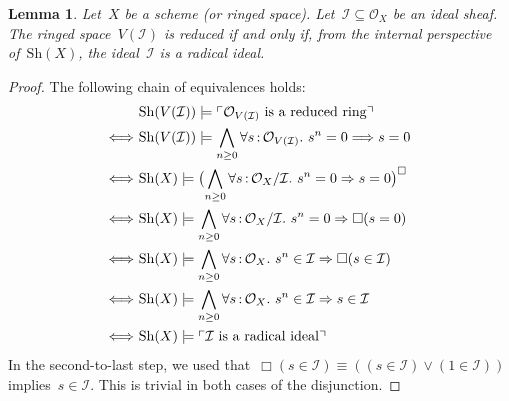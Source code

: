 \documentclass[10pt]{amsart}
\theoremstyle{definition}
\theoremstyle{plain}
\newtheorem{lemma}[defn]{Lemma}
\theoremstyle{remark}
\renewcommand{\O}{\mathcal{O}}
\newcommand{\I}{\mathcal{I}}
\newcommand{\Sh}{\mathrm{Sh}}
\newcommand{\?}{\,{:}\,}
\renewcommand{\_}{\mathpunct{.}\,}
\newcommand{\speak}[1]{\ulcorner\text{\textnormal{#1}}\urcorner}
\begin{document}
\begin{lemma}\label{lemma:closed-subspace-reduced}
Let~$X$ be a scheme (or ringed space). Let~$\I \subseteq \O_X$ be
an ideal sheaf. The ringed space~$V(\I)$ is reduced if and only if, from the
internal perspective of~$\Sh(X)$, the ideal~$\I$ is a radical ideal.\end{lemma}
\begin{proof}The following chain of equivalences holds:
\begin{align*}
  &\ \Sh(V(\I)) \models \speak{$\O_{V(\I)}$ is a reduced ring} \\
  \Longleftrightarrow&\
    \Sh(V(\I)) \models \bigwedge_{n \geq 0} \forall s\?\O_{V(\I)}\_
      s^n = 0 \Longrightarrow s = 0 \\
  \Longleftrightarrow&\
    \Sh(X) \models \bigl(\bigwedge_{n \geq 0} \forall s\?\O_X/\I\_ s^n = 0
    \Rightarrow s = 0\bigr)^\Box \\
  \Longleftrightarrow&\
    \Sh(X) \models \bigwedge_{n \geq 0} \forall s\?\O_X/\I\_ s^n = 0 \Rightarrow \Box(s = 0) \\
  \Longleftrightarrow&\
    \Sh(X) \models \bigwedge_{n \geq 0} \forall s\?\O_X\_ s^n \in \I
    \Rightarrow \Box(s \in \I) \\
  \Longleftrightarrow&\
    \Sh(X) \models \bigwedge_{n \geq 0} \forall s\?\O_X\_ s^n \in \I
    \Rightarrow s \in \I \\
  \Longleftrightarrow&\
    \Sh(X) \models \speak{$\I$ is a radical ideal}
\end{align*}
In the second-to-last step, we used that~$\Box(s \in \I) \equiv ((s \in \I) \vee
(1 \in \I))$ implies~$s \in \I$. This is trivial in both cases of the
disjunction.
\end{proof}
\end{document}
